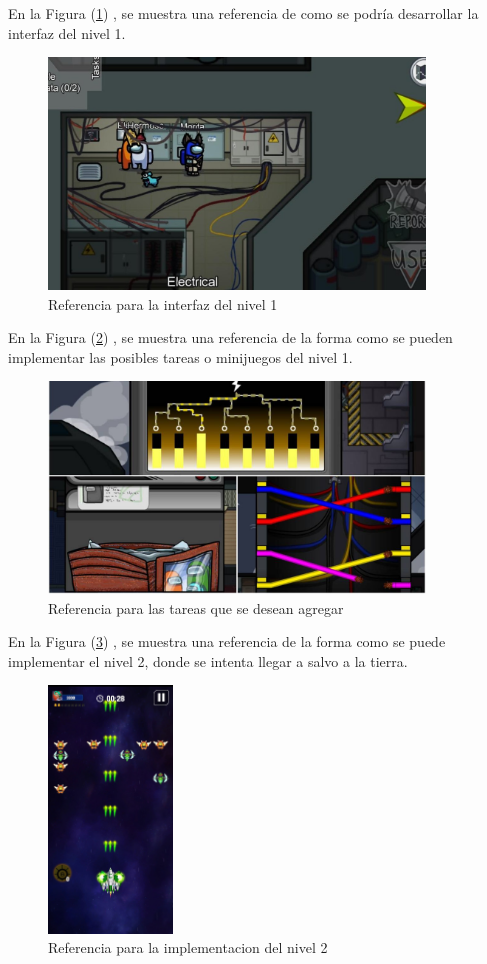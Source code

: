 \documentclass{article}
\begin{document}
En la Figura (\ref{fig:among}) \cite{amongus} , se muestra una referencia de como se podría desarrollar la interfaz del nivel 1.

\begin{figure}[h]
\includegraphics[width=10cm]{Imagenes/Among.jpg}
\centering
\caption{Referencia para la interfaz del nivel 1}
\label{fig:among}
\end{figure}

En la Figura (\ref{fig:tareas}) \cite{tareas} , se muestra una referencia de la forma como se pueden implementar las posibles tareas o minijuegos del nivel 1.

\begin{figure}[h]
\includegraphics[width=10cm]{Imagenes/Tareas.jpg}
\centering
\caption{Referencia para las tareas que se desean agregar}
\label{fig:tareas}
\end{figure}

\newpage

En la Figura (\ref{fig:nivel2}) \cite{space} , se muestra una referencia de la forma como se puede implementar el nivel 2, donde se intenta llegar a salvo a la tierra.

\begin{figure}[h]
\includegraphics[width=3.3cm]{Imagenes/Nivel 2.jpg}
\centering
\caption{Referencia para la implementacion del nivel 2}
\label{fig:nivel2}
\end{figure}
\end{document}
